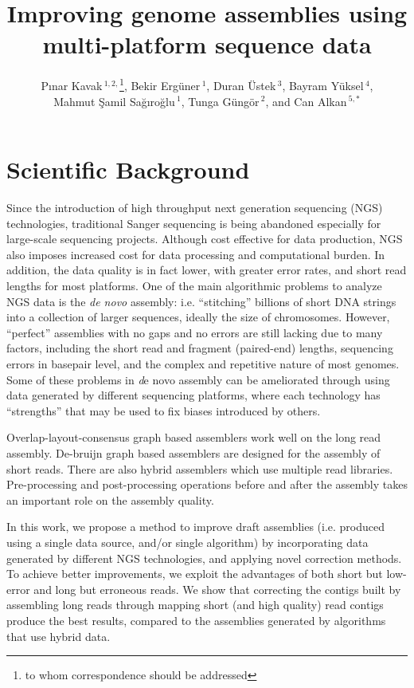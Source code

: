 \documentclass[12pt,a4paper]{cibb}
\title{\large $\ $\\ \bf Improving genome assemblies using multi-platform sequence data}
\author{ P\i nar Kavak\,$^{1,2,}$\footnote{to whom correspondence should be addressed},  Bekir Erg\"{u}ner\,$^{1}$,  Duran \"{U}stek\,$^{3}$,  Bayram Y\"{u}ksel\,$^{4}$, \\
  Mahmut \c{S}amil Sa\u{g}\i ro\u{g}lu\,$^1$, 
  Tunga G\"{u}ng\"{o}r\,$^{2}$, and 
  Can Alkan\,$^{5,*}$}
\begin{document}
\thispagestyle{myheadings}
\pagestyle{myheadings}



\section{\bf Scientific Background}

Since the introduction of high throughput next generation sequencing (NGS) technologies, traditional Sanger sequencing is being abandoned especially for large-scale sequencing projects.
Although cost effective for data production, NGS also imposes increased cost for data processing and computational burden. In addition, the data quality is in fact lower, with greater error rates, and short
read lengths for most platforms. One of the main algorithmic problems to analyze NGS data is the \textit{de novo} assembly: i.e. ``stitching'' billions of short DNA strings into a collection of larger sequences, ideally the size of chromosomes. However, ``perfect'' assemblies with no gaps and no errors are still lacking due to many factors,  including the short read and fragment (paired-end) lengths, sequencing errors in basepair level, and the complex and repetitive nature of most genomes. Some of these problems in {\textit de novo} assembly can be ameliorated through using data generated by different sequencing platforms, where each technology has ``strengths'' that may be used to fix biases introduced by others.

Overlap-layout-consensus graph based assemblers work well on the long read assembly. De-bruijn graph based assemblers are designed for the assembly of short reads. There are also hybrid assemblers which use multiple read libraries. 
Pre-processing and post-processing operations before and after the assembly takes an important role on the assembly quality.

In this work, we propose a method to improve draft assemblies (i.e. produced using a single data source, and/or single algorithm) by incorporating data generated by different NGS technologies, and applying novel correction methods. To achieve better improvements, we exploit the advantages of both short but low-error and long but erroneous reads. 
We show that correcting the contigs built by assembling long reads through mapping short (and high quality) read contigs produce the best results, compared to the assemblies generated by algorithms that use hybrid data.
\end{document}
